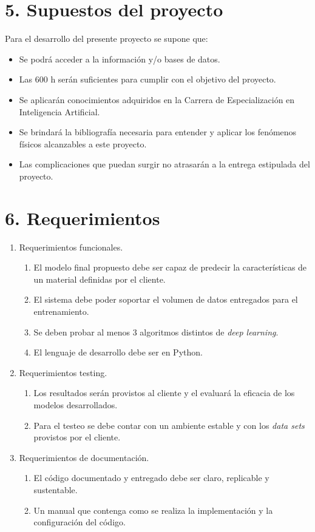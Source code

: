 \documentclass[
11pt, %
codirector, %
]{charter}
\begin{document}
\section{5. Supuestos del proyecto}
\label{sec:supuestos}


Para el desarrollo del presente proyecto se supone que:

\begin{itemize}
	\item Se podrá acceder a la información y/o bases de datos.
	\item Las 600 h serán suficientes para cumplir con el objetivo del proyecto.
	\item Se aplicarán conocimientos adquiridos en la Carrera de Especialización en Inteligencia Artificial.
	\item Se brindará la bibliografía necesaria para entender y aplicar los fenómenos físicos alcanzables a este proyecto.
	\item Las complicaciones que puedan surgir no atrasarán a la entrega estipulada del proyecto.
\end{itemize}


\section{6. Requerimientos}

\label{sec:requerimientos}

\begin{enumerate}
	\item Requerimientos funcionales.
		\begin{enumerate}
			\item El modelo final propuesto debe ser capaz de predecir la características
			de un material definidas por el cliente.
			\item El sistema debe poder soportar el volumen de datos entregados para el
			entrenamiento.
			\item Se deben probar al menos 3 algoritmos distintos de \textit{deep learning}.
			\item El lenguaje de desarrollo debe ser en Python.
		\end{enumerate}
	\item Requerimientos testing.
		\begin{enumerate}
			\item Los resultados serán provistos al cliente y el evaluará la eficacia de los
			modelos desarrollados.
			\item  Para el testeo se debe contar con un ambiente estable y con los 
			\textit{data sets} provistos por el cliente. 
		\end{enumerate}
	\item Requerimientos de documentación.
		\begin{enumerate}
			\item El código documentado y entregado debe ser claro, replicable y sustentable.
			\item Un manual que contenga como se realiza
			la implementación y la configuración del código.
		\end{enumerate}
\end{enumerate}
\end{document}
